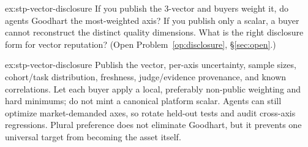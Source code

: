 \documentclass[11pt,a4paper]{article}
\theoremstyle{definition}
\begin{document}
\begin{pdexercise}[kind=Open,rating=3]{ex:stp-vector-disclosure}
If you publish the 3-vector and buyers weight it, do agents Goodhart the
most-weighted axis? If you publish only a scalar, a buyer cannot reconstruct the distinct
quality dimensions. What is the right disclosure form for
vector reputation? (Open Problem~\ref{op:disclosure}, \S\ref{sec:open}.)
\end{pdexercise}
\begin{pdsolution}{ex:stp-vector-disclosure}
Publish the vector, per-axis uncertainty, sample sizes, cohort/task
distribution, freshness, judge/evidence provenance, and known correlations.
Let each buyer apply a local, preferably non-public weighting and hard
minimums; do not mint a canonical platform scalar. Agents can still optimize
market-demanded axes, so rotate held-out tests and audit cross-axis
regressions. Plural preference does not eliminate Goodhart, but it prevents
one universal target from becoming the asset itself.
\end{pdsolution}


\end{document}
